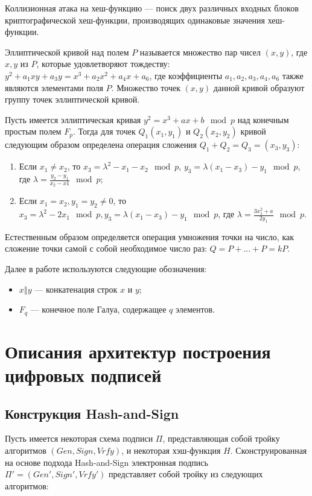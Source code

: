 \documentclass{./civarticle}
\begin{document}
Коллизионная атака на хеш-функцию --- поиск двух различных входных блоков криптографической хеш-функции, производящих одинаковые значения хеш-функции.

Эллиптической кривой над полем $P$ называется множество пар чисел $(x, y)$, где $x, y$ из $P$, которые удовлетворяют тождеству: $y^2 + a_1xy +a_3y = x^3 + a_2x^2 + a_4x + a_6$, где коэффициенты $a_1, a_2, a_3, a_4, a_6$ также являются элементами поля $P$. Множество точек $(x, y)$ данной кривой образуют группу точек эллиптической кривой.

Пусть имеется эллиптическая кривая $y^2 = x^3 + ax + b \mod p$ над конечным простым полем $F_p$. Тогда для точек $Q_1(x_1, y_1)$ и $Q_2(x_2, y_2)$ кривой следующим образом определена операция сложения $Q_1 + Q_2 = Q_3 = (x_3, y_3)$:

\begin{enumerate}
    \item Если $x_1 \neq x_2$, то $x_3 = \lambda^2 - x_1 - x_2 \mod p$, $y_3 = \lambda(x_1 - x_3) - y_1 \mod p$, где $\lambda = \frac{y_2 - y_1}{x_2 - x1} \mod p$;
    \item Если $x_1 = x_2, y_1 = y_2 \neq 0$, то $x_3 = \lambda^2 - 2x_1 \mod p, y_3 = \lambda(x_1 - x_3) - y_1 \mod p$, где $\lambda = \frac{3x_1^2 + a}{2y_1} \mod p$.
\end{enumerate}

Естественным образом определяется операция умножения точки на число, как сложение точки самой с собой необходимое число раз: $Q = P + ... + P = kP$.

Далее в работе используются следующие обозначения:
\begin{itemize}
    \item $x \mathbin\Vert y$ --- конкатенация строк $x$ и $y$;
    \item $F_q$ --- конечное поле Галуа, содержащее $q$ элементов.
\end{itemize}

\section{Описания архитектур построения цифровых подписей}

\subsection{Конструкция Hash-and-Sign}

Пусть имеется некоторая схема подписи $\Pi$, представляющая собой тройку алгоритмов $(Gen, Sign, Vrfy)$, и некоторая хэш-функция $H$. Сконструированная на основе подхода Hash-and-Sign электронная подпись $\Pi' = (Gen', Sign', Vrfy')$ представляет собой тройку из следующих алгоритмов: 
\end{document}
